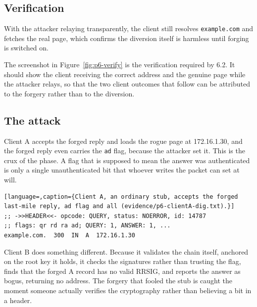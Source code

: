 \documentclass[11pt]{article}
\begin{document}
\subsection{Verification}

With the attacker relaying transparently, the client still resolves
\texttt{example.com} and fetches the real page, which confirms the diversion itself
is harmless until forging is switched on.


The screenshot in Figure~\ref{fig:p6-verify} is the verification required by 6.2.
It should show the client receiving the correct address and the genuine page while
the attacker relays, so that the two client outcomes that follow can be attributed
to the forgery rather than to the diversion.

\subsection{The attack}

Client A accepts the forged reply and loads the rogue page at 172.16.1.30, and the
forged reply even carries the \texttt{ad} flag, because the attacker set it. This
is the crux of the phase. A flag that is supposed to mean the answer was
authenticated is only a single unauthenticated bit that whoever writes the packet
can set at will.

\begin{lstlisting}[language=,caption={Client A, an ordinary stub, accepts the forged last-mile reply, ad flag and all (evidence/p6-clientA-dig.txt).}]
;; ->>HEADER<<- opcode: QUERY, status: NOERROR, id: 14787
;; flags: qr rd ra ad; QUERY: 1, ANSWER: 1, ...
example.com.  300  IN  A  172.16.1.30
\end{lstlisting}

Client B does something different. Because it validates the chain itself, anchored
on the root key it holds, it checks the signatures rather than trusting the flag,
finds that the forged A record has no valid RRSIG, and reports the answer as bogus,
returning no address. The forgery that fooled the stub is caught the moment
someone actually verifies the cryptography rather than believing a bit in a header.
\end{document}

